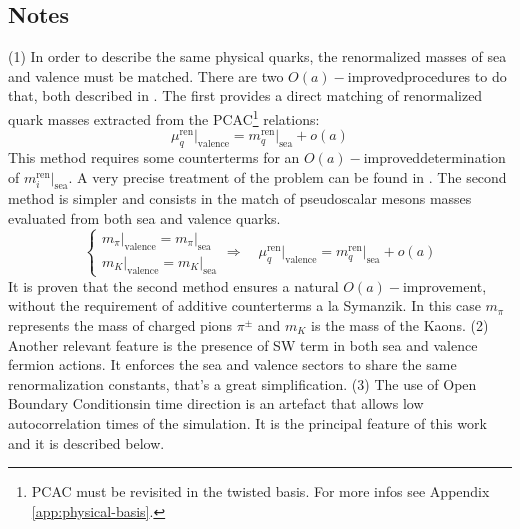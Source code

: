 \documentclass[english, LaM, oneside, noexaminfo]{sapthesis}
\newcommand{\ren}{{\text{ren}}}
\newcommand{\oaid}{$O(a)-$improved}
\newcommand{\oait}{$O(a)-$improvement}
\newcommand{\obc}{Open Boundary Conditions}
\begin{document}
\subsection*{Notes}
\noindent
(1) In order to describe the same physical quarks, the renormalized masses of sea and valence must be matched.
There are two \oaid\space procedures to do that, both described in \cite{matching-masses}.
The first provides a direct matching of renormalized quark masses extracted from the PCAC\footnote{PCAC must be revisited in the twisted basis. For more infos see Appendix \ref{app:physical-basis}.} relations:
\begin{equation*}
    \mu_q^\ren \big|_\text{valence} = m_q^\ren \big|_\text{sea} + o(a)
\end{equation*}
This method requires some counterterms for an \oaid\space determination of $m_i^\ren \big|_\text{sea}$.
A very precise treatment of the problem can be found in \cite{bussone2019matching}.
The second method is simpler and consists in the match of pseudoscalar mesons masses evaluated from both sea and valence quarks.
\begin{equation*}
    \begin{cases}
        m_\pi \big|_\text{valence} = m_\pi \big|_\text{sea} \\
        m_K \big|_\text{valence} = m_K \big|_\text{sea}
    \end{cases}
    \Longrightarrow \quad  \mu_q^\ren \big|_\text{valence} = m_q^\ren \big|_\text{sea} + o(a)
\end{equation*}
It is proven that the second method ensures a natural \oait, without the requirement of additive counterterms a la Symanzik.
In this case $m_\pi$ represents the mass of charged pions $\pi^\pm$ and $m_K$ is the mass of the Kaons.
\newline
\newline
(2) Another relevant feature is the presence of SW term in both sea and valence fermion actions. 
It enforces the sea and valence sectors to share the same renormalization constants, that's a great simplification. 
\newline
\newline
(3) The use of \obc\space in time direction is an artefact that allows low autocorrelation times of the simulation.
It is the principal feature of this work and it is described below.
\end{document}
